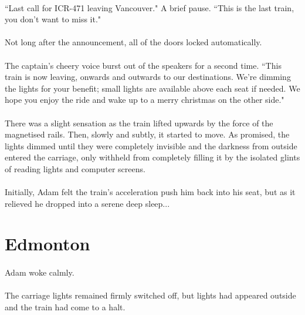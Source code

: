 \documentclass{article}
\begin{document}
\paragraph{}
``Last call for ICR-471 leaving Vancouver." A brief pause. ``This is the last train, you don't want to miss it."

\paragraph{}
Not long after the announcement, all of the doors locked automatically.

\paragraph{}
The captain's cheery voice burst out of the speakers for a second time. ``This train is now leaving, onwards and outwards to our destinations. We're dimming the lights for your benefit; small lights are available above each seat if needed. We hope you enjoy the ride and wake up to a merry christmas on the other side."

\paragraph{}
There was a slight sensation as the train lifted upwards by the force of the magnetised rails. Then, slowly and subtly, it started to move. As promised, the lights dimmed until they were completely invisible and the darkness from outside entered the carriage, only withheld from completely filling it by the isolated glints of reading lights and computer screens.

\paragraph{}
Initially, Adam felt the train's acceleration push him back into his seat, but as it relieved he dropped into a serene deep sleep...

\section{Edmonton}

\paragraph{}
Adam woke calmly.

\paragraph{}
The carriage lights remained firmly switched off, but lights had appeared outside and the train had come to a halt.
\end{document}
